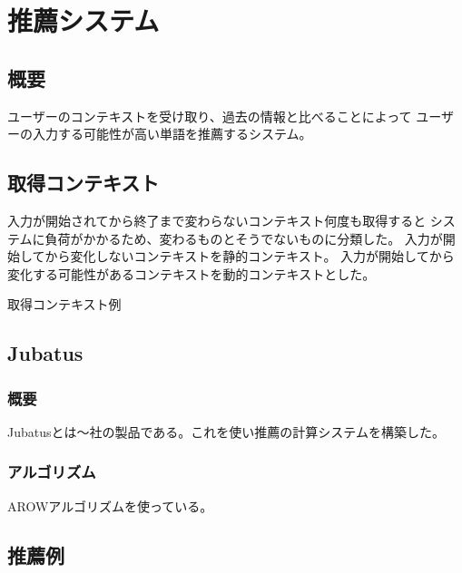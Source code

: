 \chapter{推薦システム}
\label{recommend}

\section{概要}

ユーザーのコンテキストを受け取り、過去の情報と比べることによって
ユーザーの入力する可能性が高い単語を推薦するシステム。

\section{取得コンテキスト}
\label{sec:getcontext}

入力が開始されてから終了まで変わらないコンテキスト何度も取得すると
システムに負荷がかかるため、変わるものとそうでないものに分類した。
入力が開始してから変化しないコンテキストを静的コンテキスト。
入力が開始してから変化する可能性があるコンテキストを動的コンテキストとした。

取得コンテキスト例

\section{Jubatus}
\label{sec:jubatus}

\subsection{概要}
Jubatusとは〜社の製品である。これを使い推薦の計算システムを構築した。

\subsection{アルゴリズム}
AROWアルゴリズムを使っている。


\section{推薦例}

